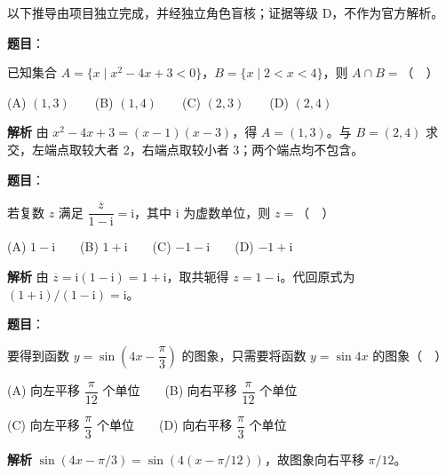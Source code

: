 
以下推导由项目独立完成，并经独立角色盲核；证据等级 D，不作为官方解析。

\begin{answer}

\textbf{题目}：

已知集合 $A=\{x\mid x^2-4x+3<0\}$，$B=\{x\mid 2<x<4\}$，则 $A\cap B=$（　）

(A) $(1,3)$　　(B) $(1,4)$　　(C) $(2,3)$　　(D) $(2,4)$

\textbf{解析}
由 $x^2-4x+3=(x-1)(x-3)$，得 $A=(1,3)$。与 $B=(2,4)$ 求交，左端点取较大者 2，右端点取较小者 3；两个端点均不包含。


\end{answer}
\begin{answer}

\textbf{题目}：

若复数 $z$ 满足 $\dfrac{\overline{z}}{1-\mathrm{i}}=\mathrm{i}$，其中 $\mathrm{i}$ 为虚数单位，则 $z=$（　）

(A) $1-\mathrm{i}$　　(B) $1+\mathrm{i}$　　(C) $-1-\mathrm{i}$　　(D) $-1+\mathrm{i}$

\textbf{解析}
由 $\overline z=\mathrm{i}(1-\mathrm{i})=1+\mathrm{i}$，取共轭得 $z=1-\mathrm{i}$。代回原式为 $(1+\mathrm{i})/(1-\mathrm{i})=\mathrm{i}$。


\end{answer}
\begin{answer}

\textbf{题目}：

要得到函数 $y=\sin\left(4x-\dfrac{\pi}{3}\right)$ 的图象，只需要将函数 $y=\sin 4x$ 的图象（　）

(A) 向左平移 $\dfrac{\pi}{12}$ 个单位　　(B) 向右平移 $\dfrac{\pi}{12}$ 个单位

(C) 向左平移 $\dfrac{\pi}{3}$ 个单位　　(D) 向右平移 $\dfrac{\pi}{3}$ 个单位

\textbf{解析}
$\sin(4x-\pi/3)=\sin(4(x-\pi/12))$，故图象向右平移 $\pi/12$。


\end{answer}
